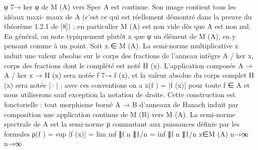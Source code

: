 \documentclass[
  10pt,
]{article}
\newenvironment{Shaded}{}{}
\newcommand{\NormalTok}[1]{#1}
\begin{document}
\begin{Shaded}
\begin{Highlighting}[]
\NormalTok{φ 7→ ker φ de M (A) vers Spec A est continue. Son image contient tous les idéaux maxi{-}}
\NormalTok{maux de A (c’est ce qui est réellement démontré dans la preuve du théorème 1.2.1 de}
\NormalTok{[8]) ; en particulier M (A) est non vide dès que A est non nul.}
\NormalTok{   En général, on note typiquement plutôt x que φ un élément de M (A), en y pensant}
\NormalTok{comme à un point. Soit x ∈ M (A). La semi{-}norme multiplicative x induit une valeur}
\NormalTok{absolue sur le corps des fractions de l’anneau intègre A / ker x, corps des fractions dont}
\NormalTok{le complété est noté H (x). L’application composée A → A / ker x → H (x) sera notée}
\NormalTok{f 7→ f (x), et la valeur absolue du corps complet H (x) sera notée |·| ; avec ces conventions}
\NormalTok{on a x(f ) = |f (x)| pour toute f ∈ A et nous utiliserons sauf exception la notation de}
\NormalTok{droite. Cette construction est fonctorielle : tout morphisme borné A → B d’anneaux de}
\NormalTok{Banach induit par composition une application continue de M (B) vers M (A).}
\NormalTok{   La semi{-}norme spectrale de A est la semi{-}norme ρ commutant aux puissances définie}
\NormalTok{par les formules}
\NormalTok{                     ρ(f ) = sup |f (x)| = lim inf ∥f n ∥1/n = inf ∥f n ∥1/n}
\NormalTok{                              x∈M (A)            n→∞                n→∞}



\end{Highlighting}
\end{Shaded}
\end{document}
